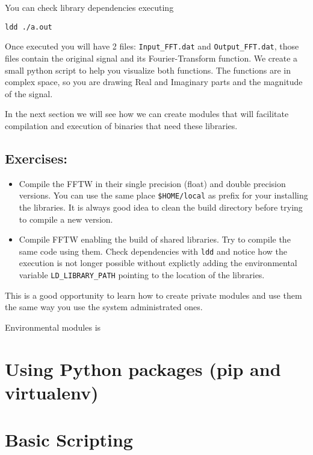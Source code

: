 You can check library dependencies executing

\begin{lstlisting}
ldd ./a.out
\end{lstlisting}

Once executed you will have 2 files: \verb|Input_FFT.dat| 	and	\verb|Output_FFT.dat|, those files contain the original signal and its Fourier-Transform function. We create a small python script to help you visualize both functions. The functions are in complex space, so you are drawing Real and Imaginary parts and the magnitude of the signal.

In the next section we will see how we can create modules that will facilitate compilation and execution of binaries that need these libraries.

\subsection{Exercises:}

\begin{itemize}
\item Compile the FFTW in their single precision (float) and double precision versions. You can use the same place \verb|$HOME/local| as prefix for your installing the libraries. It is always good idea to clean the build directory before trying to compile a new version.

\item Compile FFTW enabling the build of shared libraries.
Try to compile the same code using them. Check dependencies with \texttt{ldd} and notice how the execution is not longer possible without explictly adding the environmental variable \verb|LD_LIBRARY_PATH| pointing to the location of the libraries.

\end{itemize}



This is a good opportunity to learn how to create private modules and use them the same way you use the system administrated ones.

Environmental modules is 


\section{Using Python packages (pip and virtualenv)}
\section{Basic Scripting}
